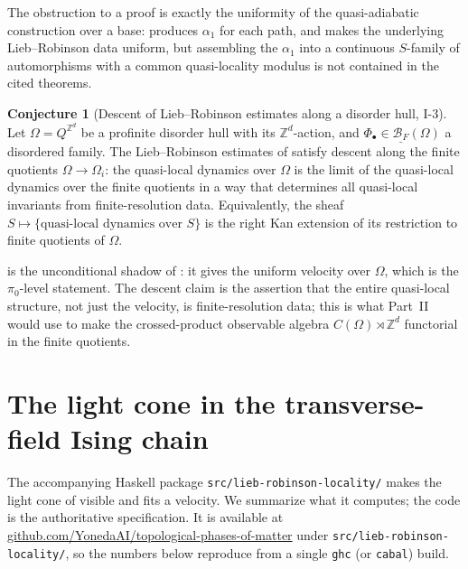 \documentclass[12pt]{article}
\newcommand{\cond}[1]{\underline{#1}}          %
\newcommand{\BF}{\mathcal{B}_{F}}              %
\newcommand{\dis}{\Omega}                       %
\newcommand{\Z}{\mathbb{Z}}
\theoremstyle{definition}
\newtheorem{conjecture}[theorem]{Conjecture}
\theoremstyle{remark}
\begin{document}
The obstruction to a proof is exactly the uniformity of the quasi-adiabatic construction over
a base:  produces $\alpha_1$ for each path, and  makes the
underlying Lieb--Robinson data uniform, but assembling the $\alpha_1$ into a continuous
$S$-family of automorphisms with a common quasi-locality modulus is not contained in the cited
theorems.

\begin{conjecture}[Descent of Lieb--Robinson estimates along a disorder hull, I-3]
\label{conj:descent}
Let $\dis=Q^{\Z^d}$ be a profinite disorder hull with its $\Z^d$-action, and
$\Phi_\bullet\in\cond{\BF}(\dis)$ a disordered family. The Lieb--Robinson estimates of
 satisfy descent along the finite quotients $\dis\to\dis_i$: the
quasi-local dynamics over $\dis$ is the limit of the quasi-local dynamics over the finite
quotients in a way that determines all quasi-local invariants from finite-resolution data.
Equivalently, the sheaf $S\mapsto\{\text{quasi-local dynamics over }S\}$ is the right Kan
extension of its restriction to finite quotients of $\dis$.
\end{conjecture}

 is the unconditional shadow of : it gives the uniform
velocity over $\dis$, which is the $\pi_0$-level statement. The descent claim is the assertion
that the entire quasi-local structure, not just the velocity, is finite-resolution data; this
is what Part~II would use to make the crossed-product observable algebra $C(\dis)\rtimes\Z^d$
functorial in the finite quotients.

\section{The light cone in the transverse-field Ising chain}
\label{sec:numerics}

The accompanying Haskell package \texttt{src/lieb-robinson-locality/} makes the light cone of
 visible and fits a velocity. We summarize what it computes; the code is the
authoritative specification. It is available at
\href{https://github.com/YonedaAI/topological-phases-of-matter}{github.com/YonedaAI/topological-phases-of-matter}
under \texttt{src/lieb-robinson-locality/}, so the numbers below reproduce from a single
\texttt{ghc} (or \texttt{cabal}) build.
\end{document}

